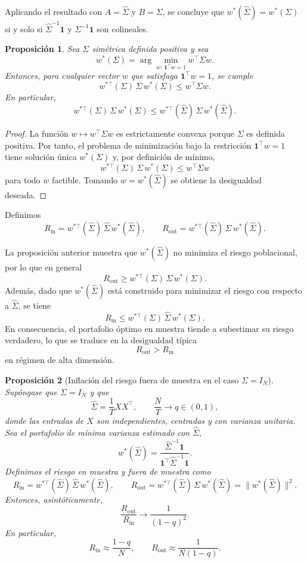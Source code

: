 \documentclass[letterpaper,12pt,oneside]{book}
\newtheorem{proposition}{Proposición}[section]
\begin{document}
Aplicando el resultado con $A=\widehat{\Sigma}$ y $B=\Sigma$, se concluye que $w^*(\widehat{\Sigma})=w^*(\Sigma)$
si y solo si $\widehat{\Sigma}^{-1}\mathbf{1}$ y $\Sigma^{-1}\mathbf{1}$ son colineales.

\begin{proposition}
Sea $\Sigma$ simétrica definida positiva y sea
\[
w^*(\Sigma)
=
\arg\min_{w:\,\mathbf{1}^\top w = 1}
w^\top \Sigma w.
\]
Entonces, para cualquier vector $w$ que satisfaga
$\mathbf{1}^\top w = 1$, se cumple
\[
w^{*\top}(\Sigma)\,\Sigma\,w^*(\Sigma)
\le
w^\top \Sigma w.
\]
En particular,
\[
w^{*\top}(\Sigma)\,\Sigma\,w^*(\Sigma)
\le
w^{*\top}(\widehat{\Sigma})\,\Sigma\,w^*(\widehat{\Sigma}).
\]
\end{proposition}

\begin{proof}
La función $w \mapsto w^\top \Sigma w$ es estrictamente convexa porque $\Sigma$ es definida positiva.
Por tanto, el problema de minimización bajo la restricción $\mathbf{1}^\top w = 1$ tiene solución única $w^*(\Sigma)$ y, por definición de mínimo,
\[
w^{*\top}(\Sigma)\,\Sigma\,w^*(\Sigma)
\le
w^\top \Sigma w
\]
para todo $w$ factible. Tomando $w = w^*(\widehat{\Sigma})$
se obtiene la desigualdad deseada.
\end{proof}

Definimos
\[
R_{\text{in}}
=
w^{*\top}(\widehat{\Sigma})
\,\widehat{\Sigma}\,
w^*(\widehat{\Sigma}),
\qquad
R_{\text{out}}
=
w^{*\top}(\widehat{\Sigma})
\,\Sigma\,
w^*(\widehat{\Sigma}).
\]

La proposición anterior muestra que $w^*(\widehat{\Sigma})$ no minimiza el riesgo poblacional,
por lo que en general
\[
R_{\text{out}}
\ge
w^{*\top}(\Sigma)\,\Sigma\,w^*(\Sigma).
\]
Además, dado que $w^*(\widehat{\Sigma})$ está construido para minimizar el riesgo con respecto
a $\widehat{\Sigma}$, se tiene
\[
R_{\text{in}}
\le
w^{*\top}(\Sigma)\,\widehat{\Sigma}\,w^*(\Sigma).
\]
En consecuencia, el portafolio óptimo en muestra tiende a subestimar su riesgo verdadero,
lo que se traduce en la desigualdad típica
\[
R_{\text{out}} > R_{\text{in}}
\]
en régimen de alta dimensión.

\begin{proposition}[Inflación del riesgo fuera de muestra en el caso $\Sigma=I_N$]
Supóngase que $\Sigma = I_N$ y que
\[
\widehat{\Sigma}=\frac{1}{T}XX^\top,
\qquad
\frac{N}{T}\to q\in(0,1),
\]
donde las entradas de $X$ son independientes, centradas y con varianza unitaria.
Sea el portafolio de mínima varianza estimado con $\widehat{\Sigma}$,
\[
w^*(\widehat{\Sigma})
=
\frac{\widehat{\Sigma}^{-1}\mathbf{1}}
{\mathbf{1}^\top \widehat{\Sigma}^{-1}\mathbf{1}}.
\]
Definimos el riesgo en muestra y fuera de muestra como
\[
R_{\text{in}}
=
w^{*\top}(\widehat{\Sigma})\,\widehat{\Sigma}\,w^*(\widehat{\Sigma}),
\qquad
R_{\text{out}}
=
w^{*\top}(\widehat{\Sigma})\,\Sigma\,w^*(\widehat{\Sigma})
=
\|w^*(\widehat{\Sigma})\|^2.
\]
Entonces, asintóticamente,
\[
\frac{R_{\text{out}}}{R_{\text{in}}}
\longrightarrow
\frac{1}{(1-q)^2}.
\]
En particular,
\[
R_{\text{in}} \approx \frac{1-q}{N},
\qquad
R_{\text{out}} \approx \frac{1}{N(1-q)}.
\]
\end{proposition}
\end{document}
